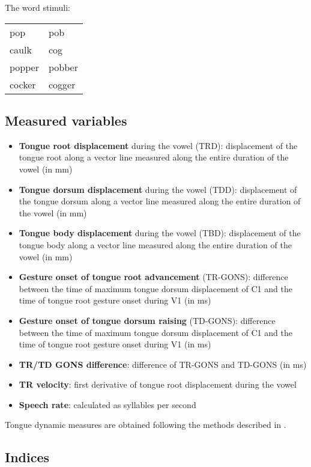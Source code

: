 \documentclass[11pt,]{article}
\providecommand{\tightlist}{%
  \setlength{\itemsep}{0pt}\setlength{\parskip}{0pt}}
\begin{document}
The word stimuli:

\begin{tabular}{ll}
pop & pob  \\
caulk & cog \\
popper & pobber \\
cocker & cogger \\
\end{tabular}

\subsection{Measured variables}\label{measured-variables}

\begin{itemize}
\tightlist
\item
  \textbf{Tongue root displacement} during the vowel (TRD): displacement
  of the tongue root along a vector line measured along the entire
  duration of the vowel (in mm)
\item
  \textbf{Tongue dorsum displacement} during the vowel (TDD):
  displacement of the tongue dorsum along a vector line measured along
  the entire duration of the vowel (in mm)
\item
  \textbf{Tongue body displacement} during the vowel (TBD): displacement
  of the tongue body along a vector line measured along the entire
  duration of the vowel (in mm)
\item
  \textbf{Gesture onset of tongue root advancement} (TR-GONS):
  difference between the time of maximum tongue dorsum displacement of
  C1 and the time of tongue root gesture onset during V1 (in ms)
\item
  \textbf{Gesture onset of tongue dorsum raising} (TD-GONS): difference
  between the time of maximum tongue dorsum displacement of C1 and the
  time of tongue root gesture onset during V1 (in ms)
\item
  \textbf{TR/TD GONS difference}: difference of TR-GONS and TD-GONS (in
  ms)
\item
  \textbf{TR velocity}: first derivative of tongue root displacement
  during the vowel
\item
  \textbf{Speech rate}: calculated as syllables per second
  \citep[\texttt{n\ of\ syllables\ /\ sentence\ duration},][]{plug2018}
\end{itemize}

Tongue dynamic measures are obtained following the methods described in
\citet{strycharczuk2015}.

\subsection{Indices}\label{indices}
\end{document}
